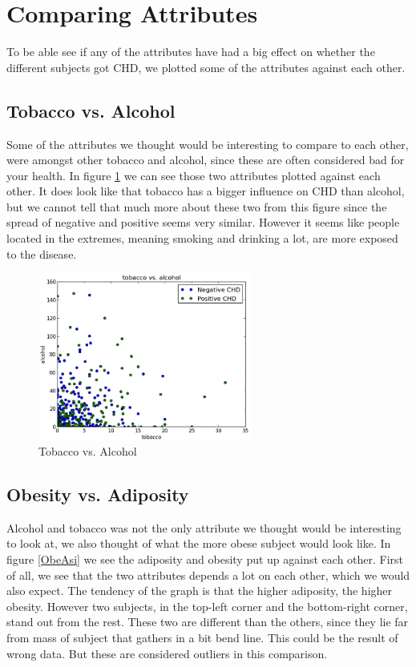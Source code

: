 \section{Comparing Attributes}
To be able see if any of the attributes have had a big effect on whether the different subjects got CHD, we plotted some of the attributes against each other.

\subsection{Tobacco vs. Alcohol}

Some of the attributes we thought would be interesting to compare to each other, were amongst other tobacco and alcohol, since these are often considered bad for your health. In figure \ref{AlcoTobac} we can see those two attributes plotted against each other. It does look like that tobacco has a bigger influence on CHD than alcohol, but we cannot tell that much more about these two from this figure since the spread of negative and positive seems very similar. However it seems like people located in the extremes, meaning smoking and drinking a lot, are more exposed to the disease.

\begin{figure}[H]
\centering
\includegraphics[width=7cm, keepaspectratio=true]{pictures/tobaccoAlcohol.png}
\vspace{-0.4cm}
\caption{\footnotesize Tobacco vs. Alcohol}
\label{AlcoTobac}
\end{figure}

\subsection{Obesity vs. Adiposity}

Alcohol and tobacco was not the only attribute we thought would be interesting to look at, we also thought of what the more obese subject would look like. In figure \ref{ObeAsi} we see the adiposity and obesity put up against each other. First of all, we see that the two attributes depends a lot on each other, which we would also expect. The tendency of the graph is that the higher adiposity, the higher obesity. However two subjects, in the top-left corner and the bottom-right corner, stand out from the rest. These two are different than the others, since they lie far from mass of subject that gathers in a bit bend line. This could be the result of wrong data. But these are considered outliers in this comparison.

